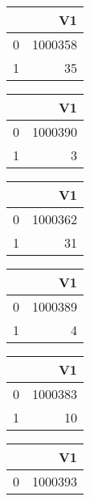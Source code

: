\bigskip\bigskip
\centering
\begin{tabular}{rr}
  \hline
 & V1 \\ 
  \hline
0 & 1000358 \\ 
  1 &  35 \\ 
   \hline
\end{tabular}

\bigskip\bigskip
\centering
\begin{tabular}{rr}
  \hline
 & V1 \\ 
  \hline
0 & 1000390 \\ 
  1 &   3 \\ 
   \hline
\end{tabular}

\bigskip\bigskip
\centering
\begin{tabular}{rr}
  \hline
 & V1 \\ 
  \hline
0 & 1000362 \\ 
  1 &  31 \\ 
   \hline
\end{tabular}

\bigskip\bigskip
\centering
\begin{tabular}{rr}
  \hline
 & V1 \\ 
  \hline
0 & 1000389 \\ 
  1 &   4 \\ 
   \hline
\end{tabular}

\bigskip\bigskip
\centering
\begin{tabular}{rr}
  \hline
 & V1 \\ 
  \hline
0 & 1000383 \\ 
  1 &  10 \\ 
   \hline
\end{tabular}

\bigskip\bigskip
\centering
\begin{tabular}{rr}
  \hline
 & V1 \\ 
  \hline
0 & 1000393 \\ 
   \hline
\end{tabular}

